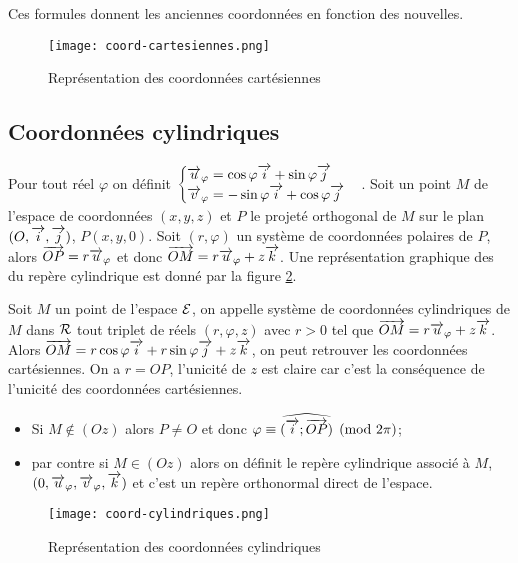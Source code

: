 \danger Ces formules donnent les \og{}anciennes\fg{} coordonnées en fonction des \og{}nouvelles\fg{}.

\begin{figure}
    \centering
    \texttt{[image: coord-cartesiennes.png]}
    \caption{Représentation des coordonnées cartésiennes}
    \label{fig:repcart}
\end{figure}

\subsection{Coordonnées cylindriques}
\label{subsec:coordcyl}
Pour tout réel \(\varphi\) on définit \(\begin{cases}\overrightarrow{u}_\varphi=\cos\varphi\overrightarrow{i}+\sin\varphi\overrightarrow{j}\\ \overrightarrow{v}_\varphi=-\sin\varphi\overrightarrow{i}+\cos\varphi\overrightarrow{j}\end{cases}\). Soit un point \(M\) de l'espace de coordonnées \((x,y,z)\) et \(P\) le projeté orthogonal de \(M\) sur le plan \((O,\overrightarrow{i},\overrightarrow{j})\), \(P(x,y,0)\). Soit \((r,\varphi)\) un système de coordonnées polaires de \(P\), alors \(\overrightarrow{OP}=r\overrightarrow{u}_\varphi\) et donc \(\overrightarrow{OM}=r\overrightarrow{u}_\varphi+z\overrightarrow{k}\). Une représentation graphique des du repère cylindrique est donné par la figure \ref{fig:repcyl}.
\begin{defdef}
  Soit \(M\) un point de l'espace \(\mathcal{E}\), on appelle système de coordonnées cylindriques de \(M\) dans \(\mathcal{R}\) tout triplet de réels \((r,\varphi,z)\) avec \(r>0\) tel que \(\overrightarrow{OM}=r\overrightarrow{u}_\varphi+z\overrightarrow{k}\). Alors \(\overrightarrow{OM}=r\cos\varphi\overrightarrow{i}+r\sin\varphi\overrightarrow{j}+z\overrightarrow{k}\), on peut retrouver les coordonnées cartésiennes. On a \(r=OP\), l'unicité de \(z\) est claire car c'est la conséquence de l'unicité des coordonnées cartésiennes. 
\begin{itemize}
\item Si \(M\notin(Oz)\) alors \(P\neq O\) et donc \(\varphi \equiv \widehat{(\overrightarrow{i};\overrightarrow{OP})} \pmod {2\pi}\);
\item par contre si \(M\in(Oz)\) alors on définit le repère cylindrique associé à \(M\), \((0,\overrightarrow{u}_\varphi,\overrightarrow{v}_\varphi,\overrightarrow{k})\) et c'est un repère orthonormal direct de l'espace.
\end{itemize}
\end{defdef}

\begin{figure}
    \centering
    \texttt{[image: coord-cylindriques.png]}
    \caption{Représentation des coordonnées cylindriques}
    \label{fig:repcyl}
\end{figure}



